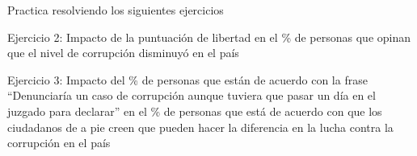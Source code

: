 \documentclass[
]{article}
\begin{document}
Practica resolviendo los siguientes ejercicios

Ejercicio 2: Impacto de la puntuación de libertad en el \% de personas
que opinan que el nivel de corrupción disminuyó en el país

Ejercicio 3: Impacto del \% de personas que están de acuerdo con la
frase ``Denunciaría un caso de corrupción aunque tuviera que pasar un
día en el juzgado para declarar'' en el \% de personas que está de
acuerdo con que los ciudadanos de a pie creen que pueden hacer la
diferencia en la lucha contra la corrupción en el país
\end{document}
